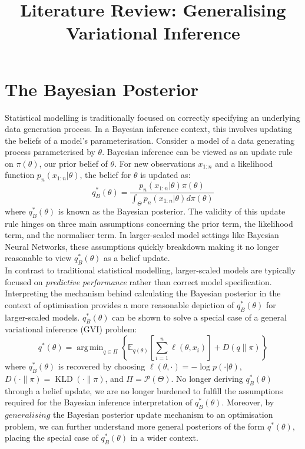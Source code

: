 \documentclass[twoside,11pt]{article}
\newcommand{\KLD}{\operatorname{KLD}}
\DeclareMathOperator*{\argmin}{arg\,min}
\begin{document}
\title{Literature Review: Generalising Variational Inference}
\maketitle
\section{The Bayesian Posterior}\label{sec:bayesian-posterior}
Statistical modelling is traditionally focused on correctly specifying an underlying data generation process. In a Bayesian inference context, this involves updating the beliefs of a model's parameterisation. Consider a model of a data generating process parameterised by $\theta$. Bayesian inference can be viewed as an update rule on $\pi(\theta)$, our prior belief of $\theta$. For new observations $x_{1:n}$ and a likelihood function $p_n(x_{1:n}|\theta)$, the belief for $\theta$ is updated as:
\[q_B^*(\theta) = \frac{p_n(x_{1:n}|\theta) \pi(\theta)}{\int_{\Theta} p_n(x_{1:n}|\theta) d \pi(\theta)}\]
where $q_B^*(\theta)$ is known as the Bayesian posterior. The validity of this update rule hinges on three main assumptions concerning the prior term, the likelihood term, and the normaliser term. In larger-scaled model settings like Bayesian Neural Networks, these assumptions quickly breakdown making it no longer reasonable to view $q_B^*(\theta)$ as a belief update. \\
\newline 
In contrast to traditional statistical modelling, larger-scaled models are typically focused on \textit{predictive performance} rather than correct model specification. Interpreting the mechanism behind calculating the Bayesian posterior in the context of optimisation provides a more reasonable depiction of $q_B^*(\theta)$ for larger-scaled models. $q_B^*(\theta)$ can be shown to solve a special case of a general variational inference (GVI) problem:
\[q^*(\theta) = \argmin_{q \in \Pi} \left\{ \mathbb{E}_{q(\theta)}\left[\sum_{i=1}^n \ell(\theta, x_i)\right] + D(q\|\pi)\right\}\]
where $q_B^*(\theta)$ is recovered by choosing $\ell(\theta, \cdot) = -\log p(\cdot | \theta)$, $D(\cdot \| \pi) = \KLD(\cdot \| \pi)$, and $\Pi = \mathcal{P}(\Theta)$. No longer deriving $q_B^*(\theta)$ through a belief update, we are no longer burdened to fulfill the assumptions required for the Bayesian inference interpretation of $q_B^*(\theta)$. Moreover, by $\textit{generalising}$ the Bayesian posterior update mechanism to an optimisation problem, we can further understand more general posteriors of the form $q^*(\theta)$, placing the special case of $q_B^*(\theta)$ in a wider context.
\end{document}
